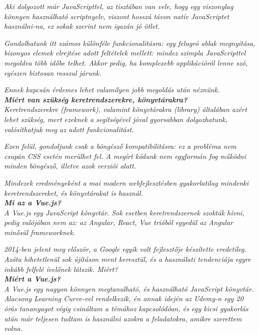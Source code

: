 \textit{Aki dolgozott már JavaScripttel, az tisztában van vele, hogy egy viszonylag könnyen használható scriptnyelv, viszont hosszú távon natív JavaScriptet használni-na, ez sokak szerint nem igazán jó ötlet.}

\textit{Gondolhatunk itt számos különféle funkcionalitásra: egy felugró ablak megnyitása, bizonyos elemek elrejtése adott feltételek mellett: mindez szimpla JavaScripttel megoldva több időbe telhet. Akkor pedig, ha komplexebb applikációról lenne szó, egészen biztosan rosszul járunk.}

\textit{Ennek kapcsán érdemes lehet valamilyen jobb megoldás után néznünk.}\\

\noindent\textit{\textbf{Miért van szükség keretrendszerekre, könyvtárakra?}}\\

\textit{Keretrendszerekre (framework), valamint könyvtárakra (library) általában azért lehet szükség, mert ezeknek a segítségével jóval gyorsabban dolgozhatunk, valósíthatjuk meg az adott funkcionalitást.}

\textit{Ezen felül, gondoljunk csak a böngésző kompatibilitásra: ez a probléma nem csupán CSS esetén merülhet fel. A megírt kódunk nem egyformán fog működni minden böngésző, illetve azok verziói alatt.}

\textit{Mindezek eredményeként a mai modern webfejlesztésben gyakorlatilag mindenki keretrendszereket, és könyvtárakat is használ.}\\

\noindent\textit{\textbf{Mi az a Vue.js?}}\\

\textit{A Vue.js egy JavaScript könyvtár. Sok esetben keretrendszernek szokták hívni, pedig valójában nem az: az Angular, React, Vue trióból egyedül az Angular minősül frameworknek.}

\textit{2014-ben jelent meg először, a Google egyik volt fejlesztője készítette eredetileg. Azóta hihetetlenül sok újításon ment keresztül, és a használati tendenciája egyre inkább felfelé ívelőnek látszik. Miért?}\\

\noindent\textit{\textbf{Miért a Vue.js?}}\\

\textit{A Vue.js egy nagyon könnyen megtanulható, és használható JavaScript könyvtár. Alacsony Learning Curve-vel rendelkezik, én annak idején az Udemy-n egy 20 órás tananyagot végig csináltam a témához kapcsolódóan, és egy kicsi gyakorlás után már teljesen tudtam is használni azokra a feladatokra, amikre szerettem volna.}

